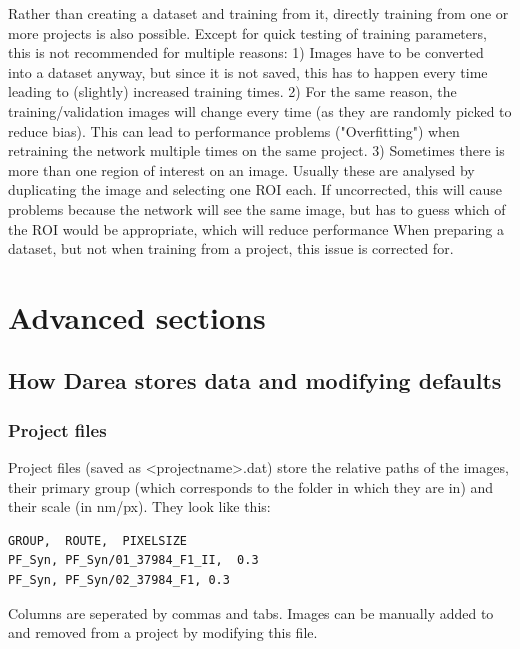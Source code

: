 \documentclass[12pt, a4paper]{scrartcl}
\begin{document}
Rather than creating a dataset and training from it, directly training from one or more projects is also possible. Except for quick testing of training parameters, this is not recommended for multiple reasons: 1) Images have to be converted into a dataset anyway, but since it is not saved, this has to happen every time leading to (slightly) increased training times. 2) For the same reason, the training/validation images will change every time (as they are randomly picked to reduce bias). This can lead to performance problems ("Overfitting") when retraining the network multiple times on the same project. 3) Sometimes there is more than one region of interest on an image. Usually these are analysed by duplicating the image and selecting one ROI each. If uncorrected, this will cause problems because the network will see the same image, but has to guess which of the ROI would be appropriate, which will reduce performance When preparing a dataset, but not when training from a project, this issue is corrected for. 

\section{Advanced sections}
\subsection{How Darea stores data and modifying defaults}
\subsubsection{Project files}
Project files (saved as <projectname>.dat) store the relative paths of the images, their primary group (which corresponds to the folder in which they are in) and their scale (in nm/px). They look like this:
\begin{lstlisting}[belowskip=0pt]
GROUP,	ROUTE,	PIXELSIZE
PF_Syn,	PF_Syn/01_37984_F1_II,	0.3
PF_Syn,	PF_Syn/02_37984_F1,	0.3
\end{lstlisting}
Columns are seperated by commas and tabs. Images can be manually added to and removed from a project by modifying this file.
\end{document}
